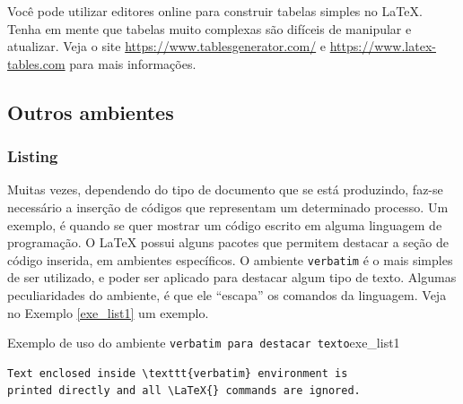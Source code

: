 


\begin{marker}
    Você pode utilizar editores online para construir tabelas simples no LaTeX. Tenha em mente que tabelas muito complexas são difíceis de manipular e atualizar. Veja o site \url{https://www.tablesgenerator.com/} e \url{https://www.latex-tables.com} para mais informações.
\end{marker}

\subsection{Outros ambientes}
\label{sec:out_ambs}


\subsubsection*{Listing}
\label{sec:listing}


Muitas vezes, dependendo do tipo de documento que se está produzindo, faz-se necessário a inserção de códigos que representam um determinado processo. Um exemplo, é quando se quer mostrar um código escrito em alguma linguagem de programação. O LaTeX possui alguns pacotes que permitem destacar a seção de código inserida, em ambientes específicos. O ambiente {\tt verbatim} é o mais simples de ser utilizado, e poder ser aplicado para destacar algum tipo de texto. Algumas peculiaridades do ambiente, é que ele ``escapa'' os comandos da linguagem. Veja no Exemplo \ref{exe_list1} um exemplo.

\begin{texexptitled}[breakable,center lower,enhanced,middle=2mm]{Exemplo de uso do ambiente {\tt verbatim para destacar texto}}{exe_list1}
\begin{verbatim}
Text enclosed inside \texttt{verbatim} environment is
printed directly and all \LaTeX{} commands are ignored.
\end{verbatim}
\end{texexptitled}

